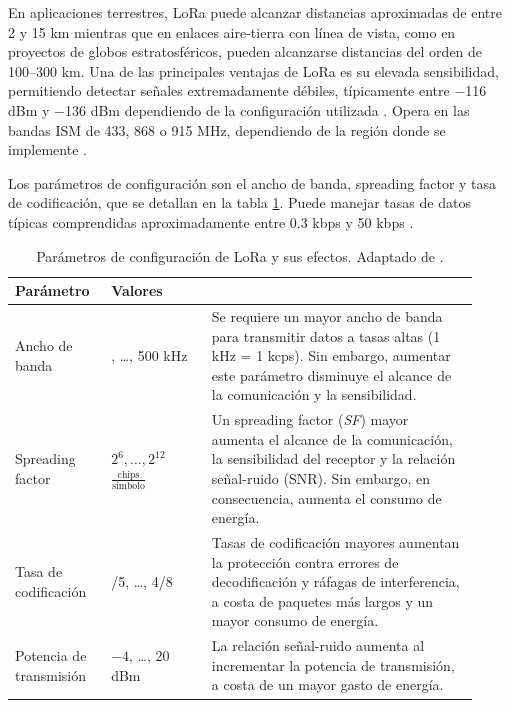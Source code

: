 \documentclass[12pt,a4paper]{article}
\begin{document}
En aplicaciones terrestres, LoRa puede alcanzar distancias aproximadas de entre 2 y 15 km \cite{ref29} mientras que en enlaces aire-tierra con línea de vista, como en proyectos de globos estratosféricos, pueden alcanzarse distancias del orden de 100--300 km. Una de las principales ventajas de LoRa es su elevada sensibilidad, permitiendo detectar señales extremadamente débiles, típicamente entre −116 dBm y −136 dBm dependiendo de la configuración utilizada \cite{ref31}. Opera en las bandas ISM de 433, 868 o 915 MHz, dependiendo de la región donde se implemente \cite{ref30,ref31}.

Los parámetros de configuración son el ancho de banda, spreading factor y tasa de codificación, que se detallan en la tabla \ref{tab:lora-parametros}. Puede manejar tasas de datos típicas comprendidas aproximadamente entre 0.3 kbps y 50 kbps \cite{ref31}.

\begin{table}[H]
\centering
\small
\renewcommand{\arraystretch}{1.3}
\begin{tabular}{@{}>{\centering\arraybackslash}m{0.19\linewidth} >{\centering\arraybackslash}m{0.2\linewidth} >{\raggedright\arraybackslash}m{0.53\linewidth}@{}}
\toprule
\textbf{Parámetro} & \textbf{Valores} & \multicolumn{1}{c}{\textbf{Efectos}} \\
\midrule
Ancho de banda & 125, \ldots, 500 kHz & Se requiere un mayor ancho de banda para transmitir datos a tasas altas (1 kHz = 1 kcps). Sin embargo, aumentar este parámetro disminuye el alcance de la comunicación y la sensibilidad. \\
\midrule
Spreading factor & $2^{6}, \ldots, 2^{12}$ $\frac{\text{chips}}{\text{símbolo}}$ & Un spreading factor (\emph{SF}) mayor aumenta el alcance de la comunicación, la sensibilidad del receptor y la relación señal-ruido (SNR). Sin embargo, en consecuencia, aumenta el consumo de energía. \\
\midrule
Tasa de codificación & 4/5, \ldots, 4/8 & Tasas de codificación mayores aumentan la protección contra errores de decodificación y ráfagas de interferencia, a costa de paquetes más largos y un mayor consumo de energía. \\
\midrule
Potencia de transmisión & $-4$, \ldots, 20 dBm & La relación señal-ruido aumenta al incrementar la potencia de transmisión, a costa de un mayor gasto de energía. \\
\bottomrule
\end{tabular}
\caption{Parámetros de configuración de LoRa y sus efectos. Adaptado de \cite{ref30}.}
\label{tab:lora-parametros}
\end{table}
\end{document}
